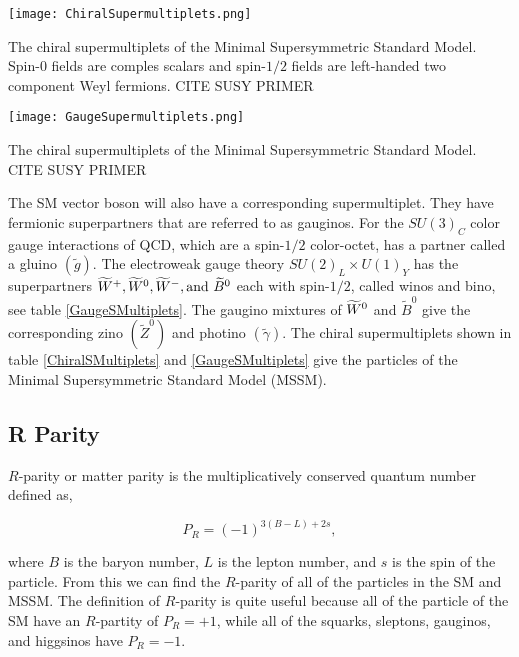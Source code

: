 \begin{table}
 	\centering
	\texttt{[image: ChiralSupermultiplets.png]}
 	\caption{The chiral supermultiplets of the Minimal Supersymmetric Standard Model. Spin-0 fields are comples scalars and spin-$1/2$ fields are left-handed two component Weyl fermions. CITE SUSY PRIMER}
 	\label{ChiralSMultiplets} 
\end{table}

\begin{table}
 	\centering
	\texttt{[image: GaugeSupermultiplets.png]}
 	\caption{The chiral supermultiplets of the Minimal Supersymmetric Standard Model. CITE SUSY PRIMER}
 	\label{GaugeSMultiplets} 
\end{table}

The SM vector boson will also have a corresponding supermultiplet. They have fermionic superpartners that are referred to as gauginos. For the $SU(3)_C$ color gauge interactions of QCD, which are a spin-$1/2$ color-octet, has a partner called a gluino $(\widetilde{g})$. The electroweak gauge theory $SU(2)_L\times U(1)_Y$ has the superpartners $\widetilde{W}^+,\widetilde{W}^0, \widetilde{W}^-, \text{and } \widetilde{B}^0$ each with spin-$1/2$, called winos and bino, see table \ref{GaugeSMultiplets}. The gaugino mixtures of $\widetilde{W}^0$ and $\widetilde{B}^0$ give the corresponding zino $(\widetilde{Z}^0)$ and photino $(\widetilde{\gamma})$. The chiral supermultiplets shown in table \ref{ChiralSMultiplets} and \ref{GaugeSMultiplets} give the particles of the Minimal Supersymmetric Standard Model (MSSM). 

\subsection{R Parity}
\label{subsec:rparity}

$R$-parity or matter parity is the multiplicatively conserved quantum number defined as, 

\begin{equation} \label{RParity}
P_R=(-1)^{3(B-L)+2s}, 
\end{equation}

where $B$ is the baryon number, $L$ is the lepton number, and $s$ is the spin of the particle. From this we can find the $R$-parity of all of the particles in the SM and MSSM. The definition of $R$-parity is quite useful because all of the particle of the SM have an $R$-partity of $P_R=+1$, while all of the squarks, sleptons, gauginos, and higgsinos have $P_R=-1$.

